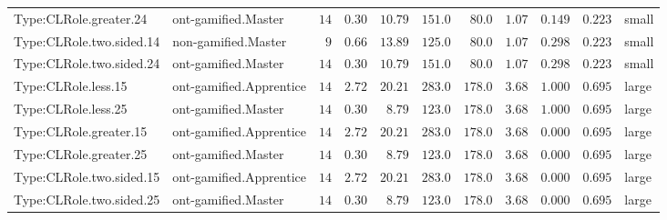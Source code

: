 \documentclass[6pt,a4paper]{article}
\begin{document}
{\begin{longtable}{llrrrrrrrrl}
Type:CLRole.greater.24&ont-gamified.Master&$14$&$0.30$&$10.79$&$151.0$&$ 80.0$&$ 1.07$&$0.149$&$0.223$&small\tabularnewline
Type:CLRole.two.sided.14&non-gamified.Master&$ 9$&$0.66$&$13.89$&$125.0$&$ 80.0$&$ 1.07$&$0.298$&$0.223$&small\tabularnewline
Type:CLRole.two.sided.24&ont-gamified.Master&$14$&$0.30$&$10.79$&$151.0$&$ 80.0$&$ 1.07$&$0.298$&$0.223$&small\tabularnewline
Type:CLRole.less.15&ont-gamified.Apprentice&$14$&$2.72$&$20.21$&$283.0$&$178.0$&$ 3.68$&$1.000$&$0.695$&large\tabularnewline
Type:CLRole.less.25&ont-gamified.Master&$14$&$0.30$&$ 8.79$&$123.0$&$178.0$&$ 3.68$&$1.000$&$0.695$&large\tabularnewline
Type:CLRole.greater.15&ont-gamified.Apprentice&$14$&$2.72$&$20.21$&$283.0$&$178.0$&$ 3.68$&$0.000$&$0.695$&large\tabularnewline
Type:CLRole.greater.25&ont-gamified.Master&$14$&$0.30$&$ 8.79$&$123.0$&$178.0$&$ 3.68$&$0.000$&$0.695$&large\tabularnewline
\newpage
Type:CLRole.two.sided.15&ont-gamified.Apprentice&$14$&$2.72$&$20.21$&$283.0$&$178.0$&$ 3.68$&$0.000$&$0.695$&large\tabularnewline
Type:CLRole.two.sided.25&ont-gamified.Master&$14$&$0.30$&$ 8.79$&$123.0$&$178.0$&$ 3.68$&$0.000$&$0.695$&large\tabularnewline
\hline
\end{longtable}}
\end{document}
